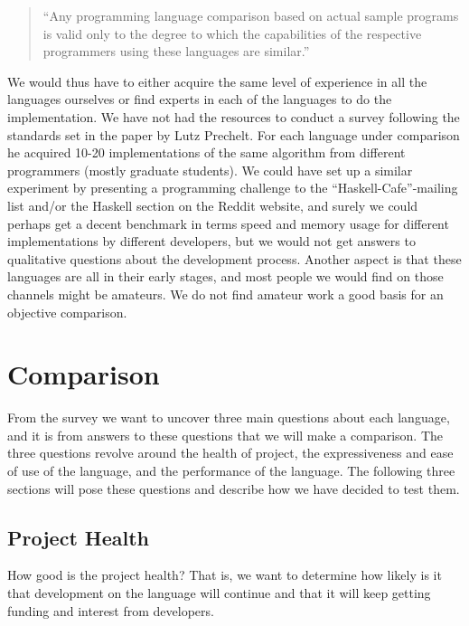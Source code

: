 \begin{quote}
  ``Any programming language comparison based on actual sample programs
  is valid only to the degree to which the capabilities of the
  respective programmers using these languages are similar.''
\end{quote}

We would thus have to either acquire the same level of experience in all the
languages ourselves or find experts in each of the languages to do the
implementation. We have not had the resources to conduct a survey
following the standards set in the paper by Lutz Prechelt. For each
language under comparison he acquired 10-20 implementations of the
same algorithm from different programmers (mostly graduate
students). We could have set up a similar experiment by presenting a
programming challenge to the ``Haskell-Cafe''-mailing list and/or the
Haskell section on the Reddit website, and surely we could perhaps get
a decent benchmark in terms speed and memory usage for different
implementations by different developers, but we would not get answers
to qualitative questions about the development process. Another aspect
is that these languages are all in their early stages, and most people
we would find on those channels might be amateurs. We do not find
amateur work a good basis for an objective comparison.


\section{Comparison}
From the survey we want to uncover three main questions about each
language, and it is from answers to these questions that we will make
a comparison. The three questions revolve around the health of
project, the expressiveness and ease of use of the language, and the
performance of the language. The following three sections will pose
these questions and describe how we have decided to test them.


\subsection{Project Health}
How good is the project health? That is,
we want to determine how likely is it that development on the language
will continue and that it will keep getting funding and interest from
developers.

